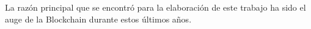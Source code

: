 La razón principal que se encontró para la elaboración de este trabajo ha sido el auge de la Blockchain\cite{whatIsWeb3} durante estos últimos años.
